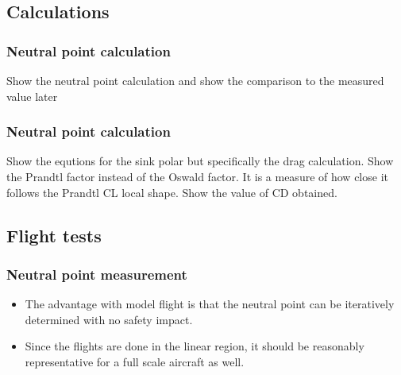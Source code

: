 \documentclass{beamer}
\begin{document}
\subsection{Calculations} %

\begin{frame}
\frametitle{Neutral point calculation}
Show the neutral point calculation and show the comparison to the measured value later


\end{frame}


\begin{frame}
\frametitle{Neutral point calculation}
Show the equtions for the sink polar but specifically the drag calculation.  Show the Prandtl factor instead of the Oswald factor.  It is a measure of how close it follows the Prandtl CL local shape.
Show the value of CD obtained.


\end{frame}




\subsection{Flight tests}




\begin{frame}
\frametitle{Neutral point measurement}

\begin{itemize}
\item The advantage with model flight is that the neutral point can be iteratively determined with no safety impact.
\item Since the flights are done in the linear region, it should be reasonably representative for a full scale aircraft as well.
\end{itemize}

\end{frame}
\end{document}
